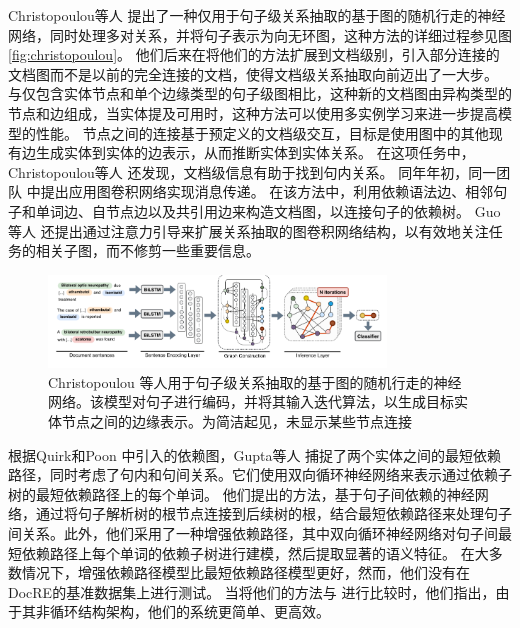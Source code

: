 \documentclass[bachelor]{thesis-uestc}
\begin{document}
Christopoulou等人 \cite{christopoulou-etal-2018-walk} 提出了一种仅用于句子级关系抽取的基于图的随机行走的神经网络，同时处理多对关系，并将句子表示为向无环图，这种方法的详细过程参见图\ref{fig:christopoulou}。
他们后来在将他们的方法扩展到文档级别，引入部分连接的文档图而不是以前的完全连接的文档，使得文档级关系抽取向前迈出了一大步。
与仅包含实体节点和单个边缘类型的句子级图相比，这种新的文档图由异构类型的节点和边组成，当实体提及可用时，这种方法可以使用多实例学习来进一步提高模型的性能。
节点之间的连接基于预定义的文档级交互，目标是使用图中的其他现有边生成实体到实体的边表示，从而推断实体到实体关系。
在这项任务中，Christopoulou等人 \cite{christopoulou-etal-2019-connecting}还发现，文档级信息有助于找到句内关系。
同年年初，同一团队 \cite{sahu2019inter}中提出应用图卷积网络实现消息传递。
在该方法中，利用依赖语法边、相邻句子和单词边、自节点边以及共引用边来构造文档图，以连接句子的依赖树。
Guo等人 \cite{guo-etal-2019-attention}还提出通过注意力引导来扩展关系抽取的图卷积网络结构，以有效地关注任务的相关子图，而不修剪一些重要信息。\par
\begin{figure}
    \centering
    \includegraphics[width=0.8\textwidth]{misc/DAG2018.png}
    \caption{Christopoulou \cite{christopoulou-etal-2018-walk} 等人用于句子级关系抽取的基于图的随机行走的神经网络。该模型对句子进行编码，并将其输入迭代算法，以生成目标实体节点之间的边缘表示。为简洁起见，未显示某些节点连接}
\end{figure}\label{fig:christopoulou}


根据Quirk和Poon \cite{quirk-poon-2017-distant} 中引入的依赖图，Gupta等人 \cite{Gupta_Rajaram_Schütze_Runkler_2019} 捕捉了两个实体之间的最短依赖路径，同时考虑了句内和句间关系。它们使用双向循环神经网络来表示通过依赖子树的最短依赖路径上的每个单词。
他们提出的方法，基于句子间依赖的神经网络，通过将句子解析树的根节点连接到后续树的根，结合最短依赖路径来处理句子间关系。此外，他们采用了一种增强依赖路径，其中双向循环神经网络对句子间最短依赖路径上每个单词的依赖子树进行建模，然后提取显著的语义特征。
在大多数情况下，增强依赖路径模型比最短依赖路径模型更好，然而，他们没有在DocRE的基准数据集上进行测试。
当将他们的方法与 \cite{peng-etal-2017-cross}进行比较时，他们指出，由于其非循环结构架构，他们的系统更简单、更高效。\par
\end{document}
